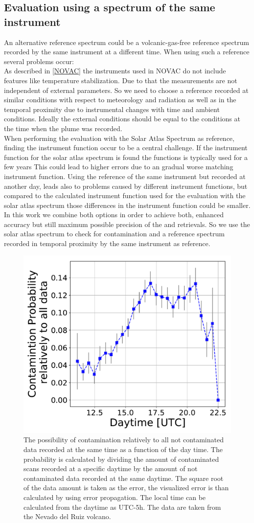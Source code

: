 %
\subsection*{Evaluation using a spectrum of the same instrument}
An alternative reference spectrum could be a volcanic-gas-free reference
spectrum recorded by the same instrument at a different time. When using such a reference several problems occur:\\
As described in \cref{NOVAC} the instruments used in NOVAC do not include features like temperature stabilization. Due to that the measurements are not independent of external parameters. 
So we need to choose a reference recorded at similar conditions with respect to meteorology and	radiation as well as in the temporal proximity due to instrumental changes with time and ambient conditions. Ideally the external conditions should be equal to the conditions at the time when the plume was recorded.\\
%
When performing the evaluation with the Solar Atlas Spectrum as reference, finding the instrument function occur to be a central challenge. If the instrument function for the solar atlas spectrum is found the functions is typically used for a few years This could lead to higher errors due to an gradual worse matching instrument function.
Using the reference of the same instrument but recorded at another day, leads also to problems caused by different instrument functions, but compared to the calculated instrument function used for the evaluation with the solar atlas spectrum those differences in the instrument function could be smaller.
\\
In this work we combine both options in order to
achieve both, enhanced accuracy but still maximum possible precision of
the  and  retrievals. So we use the solar atlas spectrum to check for 
contamination and a reference spectrum recorded in temporal proximity by the same instrument as reference.\\
\begin{figure}
\centering
\includegraphics[width=0.5\linewidth]{Bilder/ConProb}
\caption{The possibility of contamination relatively to all not contaminated data recorded at the same time as a function of the day time. The probability is calculated by dividing the amount of contaminated scans recorded at a specific daytime by the amount of not contaminated data recorded at the same daytime. The square root of the data amount is taken as the error, the visualized error is than calculated by using error propagation. The local time can be calculated from the daytime as UTC-5h. The data are taken from the Nevado del Ruiz volcano.}
\label{fig:conprob}
\end{figure}
